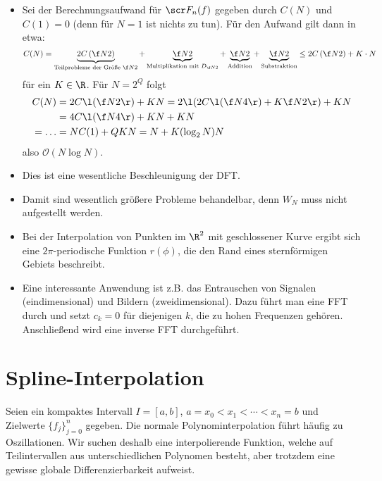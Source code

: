 \documentclass[11pt]{scrbook}
\begin{document}
\begin{nt*}[Aufwandsbetrachtung]
		\begin{itemize}
			\item
				Sei der Berechnungsaufwand für $\scr F_n(f)$ gegeben durch $C(N)$ und $C(1)=0$ (denn für $N=1$ ist nichts zu tun).
				Für den Aufwand gilt dann in etwa:
				\[
					C(N) = \underbrace{2C\left(\f N2\right)}_{\text{Teilprobleme der Größe $\f N2$}} + \underbrace{\f N2}_{\text{Multiplikation mit $D_{\f N2}$}} + \underbrace{\f N2}_{\text{Addition}} + \underbrace{\f N2}_{\text{Substraktion}} \le 2 C\left(\f N2\right) + K\cdot N
				\]
				für ein $K\in \R$.
				Für $N=2^Q$ folgt
				\begin{align*}
					C(N) &= 2C\l(\f N2\r) + KN = 2\l(2C\l(\f N4\r) + K\f N2\r) + KN \\
					&= 4C\l(\f N4\r) + KN + KN \\
					= \dotso &= NC(1) + QKN = N + K(\log_2 N)N 
				\end{align*}
				also $\mathcal O(N\log N)$.
			\item
				Dies ist eine wesentliche Beschleunigung der DFT.
			\item
				Damit sind wesentlich größere Probleme behandelbar, denn $W_N$ muss nicht aufgestellt werden.
		\end{itemize}
\end{nt*}

\begin{nt*}
	\begin{itemize}
		\item
			Bei der Interpolation von Punkten im $\R^2$ mit geschlossener Kurve ergibt sich eine $2\pi$-periodische Funktion $r(\phi)$, die den Rand eines sternförmigen Gebiets beschreibt.
		\item
			Eine interessante Anwendung ist z.B. das Entrauschen von Signalen (eindimensional) und Bildern (zweidimensional).
			Dazu führt man eine FFT durch und setzt $c_k= 0$ für diejenigen $k$, die zu hohen Frequenzen gehören. 
			Anschließend wird eine inverse FFT durchgeführt.
	\end{itemize}
\end{nt*}


\section{Spline-Interpolation}


Seien ein kompaktes Intervall $I=[a,b]$, $a=x_0<x_1 < \dotsb < x_n = b$ und Zielwerte $\{f_j\}_{j=0}^n$ gegeben.
Die normale Polynominterpolation führt häufig zu Oszillationen.
Wir suchen deshalb eine interpolierende Funktion, welche auf Teilintervallen aus unterschiedlichen Polynomen besteht, aber trotzdem eine gewisse globale Differenzierbarkeit aufweist.
\end{document}
